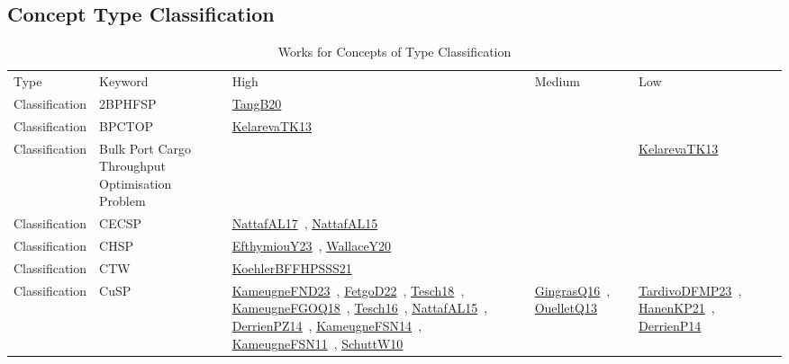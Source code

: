 \clearpage
\subsection{Concept Type Classification}
\label{sec:Classification}
{\scriptsize
\begin{longtable}{lp{3cm}>{\raggedright\arraybackslash}p{6cm}>{\raggedright\arraybackslash}p{6cm}>{\raggedright\arraybackslash}p{8cm}}
\rowcolor{white}\caption{Works for Concepts of Type Classification}\\ \toprule
\rowcolor{white}Type & Keyword & High & Medium & Low\\ \midrule\endhead
\bottomrule
\endfoot
Classification & 2BPHFSP & \href{works/TangB20.pdf}{TangB20}~\cite{TangB20} &  & \\
Classification & BPCTOP & \href{works/KelarevaTK13.pdf}{KelarevaTK13}~\cite{KelarevaTK13} &  & \\
Classification & Bulk Port Cargo Throughput Optimisation Problem &  &  & \href{works/KelarevaTK13.pdf}{KelarevaTK13}~\cite{KelarevaTK13}\\
Classification & CECSP & \href{works/NattafAL17.pdf}{NattafAL17}~\cite{NattafAL17}, \href{works/NattafAL15.pdf}{NattafAL15}~\cite{NattafAL15} &  & \\
Classification & CHSP & \href{works/EfthymiouY23.pdf}{EfthymiouY23}~\cite{EfthymiouY23}, \href{works/WallaceY20.pdf}{WallaceY20}~\cite{WallaceY20} &  & \\
Classification & CTW & \href{works/KoehlerBFFHPSSS21.pdf}{KoehlerBFFHPSSS21}~\cite{KoehlerBFFHPSSS21} &  & \\
Classification & CuSP & \href{works/KameugneFND23.pdf}{KameugneFND23}~\cite{KameugneFND23}, \href{works/FetgoD22.pdf}{FetgoD22}~\cite{FetgoD22}, \href{works/Tesch18.pdf}{Tesch18}~\cite{Tesch18}, \href{works/KameugneFGOQ18.pdf}{KameugneFGOQ18}~\cite{KameugneFGOQ18}, \href{works/Tesch16.pdf}{Tesch16}~\cite{Tesch16}, \href{works/NattafAL15.pdf}{NattafAL15}~\cite{NattafAL15}, \href{works/DerrienPZ14.pdf}{DerrienPZ14}~\cite{DerrienPZ14}, \href{works/KameugneFSN14.pdf}{KameugneFSN14}~\cite{KameugneFSN14}, \href{works/KameugneFSN11.pdf}{KameugneFSN11}~\cite{KameugneFSN11}, \href{works/SchuttW10.pdf}{SchuttW10}~\cite{SchuttW10} & \href{works/GingrasQ16.pdf}{GingrasQ16}~\cite{GingrasQ16}, \href{works/OuelletQ13.pdf}{OuelletQ13}~\cite{OuelletQ13} & \href{works/TardivoDFMP23.pdf}{TardivoDFMP23}~\cite{TardivoDFMP23}, \href{works/HanenKP21.pdf}{HanenKP21}~\cite{HanenKP21}, \href{works/DerrienP14.pdf}{DerrienP14}~\cite{DerrienP14}\\

\end{longtable}}
